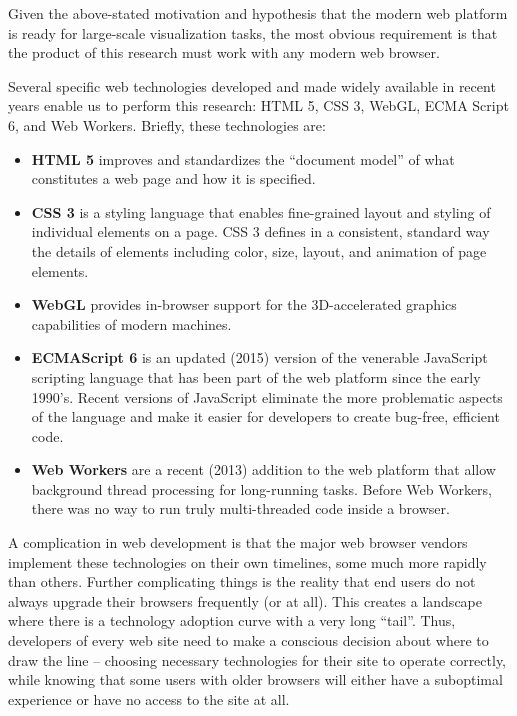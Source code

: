 Given the above-stated motivation and hypothesis that the modern web platform is ready for large-scale visualization tasks, the most obvious requirement is that the product of this research must work with any modern web browser.

Several specific web technologies developed and made widely available in recent years enable us to perform this research: HTML 5, CSS 3, WebGL, ECMA Script 6, and Web Workers. Briefly, these technologies are:

\begin{itemize}
\tightlist
\item
  \textbf{HTML 5} improves and standardizes the ``document model'' of
  what constitutes a web page and how it is specified.
\item
  \textbf{CSS 3} is a styling language that enables fine-grained layout
  and styling of individual elements on a page. CSS 3 defines in a
  consistent, standard way the details of elements including color,
  size, layout, and animation of page elements.
\item
  \textbf{WebGL} provides in-browser support for the 3D-accelerated
  graphics capabilities of modern machines.
\item
  \textbf{ECMAScript 6} is an updated (2015) version of the venerable
  JavaScript scripting language that has been part of the web platform
  since the early 1990's. Recent versions of JavaScript eliminate the
  more problematic aspects of the language and make it easier for
  developers to create bug-free, efficient code.
\item
  \textbf{Web Workers} are a recent (2013) addition to the web platform
  that allow background thread processing for long-running tasks. Before
  Web Workers, there was no way to run truly multi-threaded code inside
  a browser.
\end{itemize}

A complication in web development is that the major web browser vendors implement these technologies on their own timelines, some much more rapidly than others. Further complicating things is the reality that end users do not always upgrade their browsers frequently (or at all). This creates a landscape where there is a technology adoption curve with a very long ``tail''. Thus, developers of every web site need to make a conscious decision about where to draw the line -- choosing necessary technologies for their site to operate correctly, while knowing that some users with older browsers will either have a suboptimal experience or have no access to the site at all.

